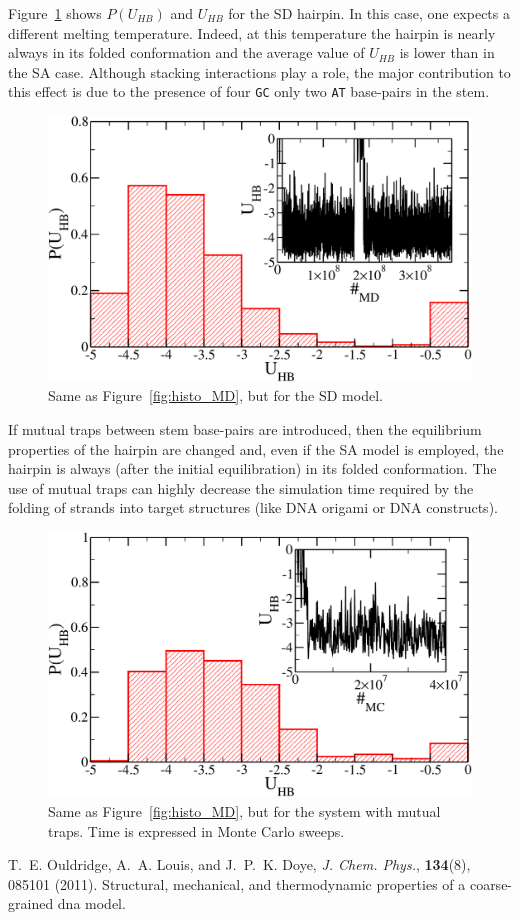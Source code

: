 \documentclass[superscriptaddress,prb]{revtex4-1}
\begin{document}
Figure~\ref{fig:histo_MD_seq_dep} shows $P(U_{HB})$ and $U_{HB}$ for the SD hairpin. In this case, one expects a different melting temperature. Indeed, at this temperature the hairpin is nearly always in its folded conformation and the average value of $U_{HB}$ is lower than in the SA case. Although stacking interactions play a role, the major contribution to this effect is due to the presence of four \texttt{GC} only two \texttt{AT} base-pairs in the stem.

\begin{figure}[h!]
\centering
\includegraphics[width=12cm]{histo_MD_seq_dep.pdf}
\caption{Same as Figure~\ref{fig:histo_MD}, but for the SD model.}
\label{fig:histo_MD_seq_dep}
\end{figure}

If mutual traps between stem base-pairs are introduced, then the equilibrium properties of the hairpin are changed and, even if the SA model is employed, the hairpin is always (after the initial equilibration) in its folded conformation. The use of mutual traps can highly decrease the simulation time required by the folding of strands into target structures (like DNA origami or DNA constructs).

\begin{figure}[h!]
\centering
\includegraphics[width=12cm]{histo_TRAP.pdf}
\caption{Same as Figure~\ref{fig:histo_MD}, but for the system with mutual traps. Time is expressed in Monte Carlo sweeps.}
\label{fig:histo_TRAP}
\end{figure}

\newpage

\begin{thebibliography}{10}

T.~E. Ouldridge, A.~A. Louis, and J.~P.~K. Doye, {\em J. Chem. Phys.}, {\bf
  134}(8), 085101 (2011). Structural, mechanical, and thermodynamic properties
  of a coarse-grained dna model.

\end{thebibliography}
\end{document}
